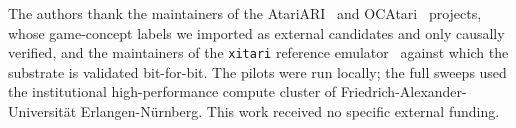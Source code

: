 The authors thank the maintainers of the AtariARI~\cite{anand2019unsupervised} and
OCAtari~\cite{delfosse2023ocatari} projects, whose game-concept labels we imported as
external candidates and only causally verified, and the maintainers of the
\texttt{xitari} reference emulator~\cite{xitari} against which the substrate is
validated bit-for-bit. The pilots were run locally; the full sweeps used the
institutional high-performance compute cluster of Friedrich-Alexander-Universit\"at
Erlangen-N\"urnberg. This work received no specific external funding.

